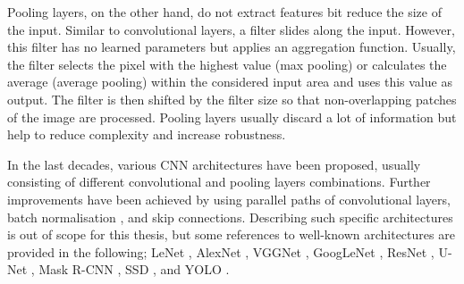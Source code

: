 Pooling layers, on the other hand, do not extract features bit reduce the size of the input.
Similar to convolutional layers, a filter slides along the input.
However, this filter has no learned parameters but applies an aggregation function.
Usually, the filter selects the pixel with the highest value (max pooling) or calculates the average (average pooling) within the considered input area and uses this value as output.
The filter is then shifted by the filter size so that non-overlapping patches of the image are processed.
Pooling layers usually discard a lot of information but help to reduce complexity and increase robustness.

In the last decades, various CNN architectures have been proposed, usually consisting of different convolutional and pooling layers combinations.
Further improvements have been achieved by using parallel paths of convolutional layers, batch normalisation , and skip connections.
Describing such specific architectures is out of scope for this thesis, but some references to well-known architectures are provided in the following; LeNet , AlexNet , VGGNet , GoogLeNet , ResNet , U-Net , Mask R-CNN , SSD , and YOLO .


